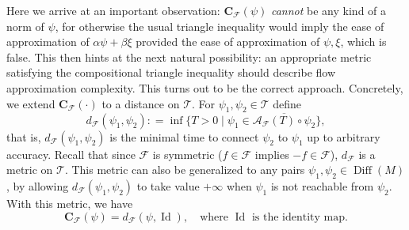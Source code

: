 \documentclass[12pt]{amsart}
\numberwithin{equation}{section}
\theoremstyle{remark}
\begin{document}
Here we arrive at an important observation:
$\mathbf C_{\mathcal F}(\psi)$ \emph{cannot} be any kind of a norm of $\psi$,
for otherwise the usual triangle inequality would imply the ease of approximation
of $\alpha \psi + \beta \xi$ provided the ease of approximation of $\psi,\xi$, which is false.
This then hints at the next natural possibility: an appropriate metric
satisfying the compositional triangle inequality should describe flow
approximation complexity.
This turns out to be the correct approach. Concretely, we extend $\mathbf C_{\mathcal F}(\cdot)$  to a distance on $\mathcal T$. For $\psi_1,\psi_2\in\mathcal T$ define
\begin{equation}
    \label{eq:d_f_def}
    d_{\mathcal F}(\psi_1, \psi_2): = \inf\{T>0\mid \psi_1\in \overline{\mathcal A_{\mathcal F}(T)\circ \psi_2}\},
\end{equation}
that is, $d_{\mathcal F}(\psi_1,\psi_2)$ is the minimal time to connect $\psi_2$ to $\psi_1$ up to arbitrary accuracy.
Recall that since $\mathcal F$ is symmetric ($f\in \mathcal F$ implies $-f\in \mathcal F$),
$d_{\mathcal F}$ is a metric on $\mathcal T$.
This metric can also be generalized to any pairs $\psi_1,\psi_2\in \operatorname{Diff}(M)$,
by allowing $d_{\mathcal F}(\psi_1,\psi_2)$ to take value $+\infty$ when $\psi_1$ is not reachable from $\psi_2$.
 With this metric, we have
\begin{equation*}
    \mathbf C_{\mathcal F}(\psi) = d_{\mathcal F}(\psi, \operatorname{Id}),\quad \text{where } \operatorname{Id} \text{ is the identity map.}
\end{equation*}
\end{document}
